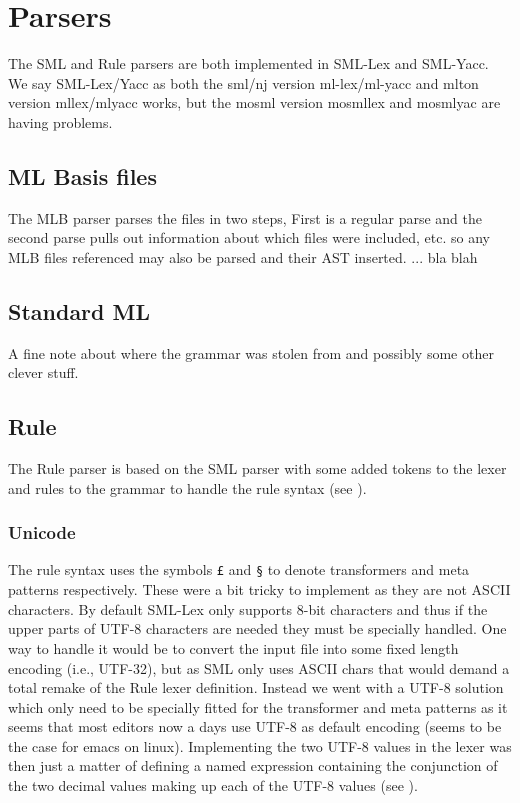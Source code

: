 
\section{Parsers}

The SML and Rule parsers are both implemented in SML-Lex and SML-Yacc. We say
SML-Lex/Yacc as both the sml/nj version ml-lex/ml-yacc and mlton version
mllex/mlyacc works, but the mosml version mosmllex and mosmlyac are having
problems.


\subsection{ML Basis files}

The MLB parser parses the files in two steps, First is a regular parse and the
second parse pulls out information about which files were included, etc. so any
MLB files referenced may also be parsed and their AST inserted.  ... bla blah


\subsection{Standard ML}

A fine note about where the grammar was stolen from and possibly some other
clever stuff.


\subsection{Rule}

The Rule parser is based on the SML parser with some added tokens to the lexer
and rules to the grammar to handle the rule syntax (see
). 


\subsubsection{Unicode}

The rule syntax uses the symbols \texttt{£} and \texttt{§} to denote
transformers and meta patterns respectively. These were a bit tricky to
implement as they are not ASCII characters. By default SML-Lex\cite{ml-lex-yacc}
only supports 8-bit characters and thus if the upper parts of UTF-8 characters
are needed they must be specially handled. One way to handle it would be to
convert the input file into some fixed length encoding (i.e., UTF-32), but as
SML only uses ASCII chars that would demand a total remake of the Rule lexer
definition. Instead we went with a UTF-8 solution which only need to be
specially fitted for the transformer and meta patterns as it seems that most
editors now a days use UTF-8 as default encoding (seems to be the case for emacs
on linux). Implementing the two UTF-8 values in the lexer was then just a matter
of defining a named expression containing the conjunction of the two decimal
values making up each of the UTF-8 values (see ).

